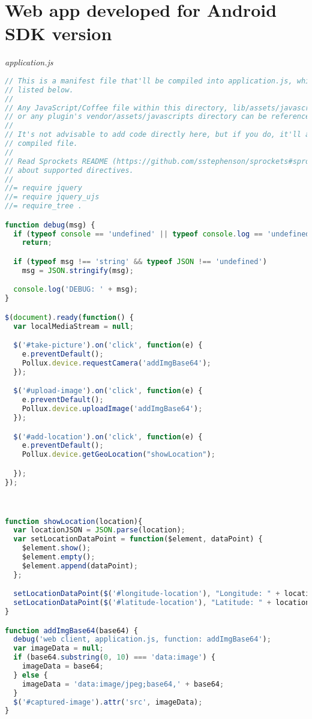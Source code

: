 \newpage

\section{Web app developed for Android SDK version} \label{App:AppendixC}
\emph{application.js}
\begin{lstlisting}[language=JavaScript]
// This is a manifest file that'll be compiled into application.js, which will include all the files
// listed below.
//
// Any JavaScript/Coffee file within this directory, lib/assets/javascripts, vendor/assets/javascripts,
// or any plugin's vendor/assets/javascripts directory can be referenced here using a relative path.
//
// It's not advisable to add code directly here, but if you do, it'll appear at the bottom of the
// compiled file.
//
// Read Sprockets README (https://github.com/sstephenson/sprockets#sprockets-directives) for details
// about supported directives.
//
//= require jquery
//= require jquery_ujs
//= require_tree .

function debug(msg) {
  if (typeof console == 'undefined' || typeof console.log == 'undefined')
    return;

  if (typeof msg !== 'string' && typeof JSON !== 'undefined')
    msg = JSON.stringify(msg);

  console.log('DEBUG: ' + msg);
}

$(document).ready(function() {
  var localMediaStream = null;

  $('#take-picture').on('click', function(e) {
    e.preventDefault();
    Pollux.device.requestCamera('addImgBase64');
  });

  $('#upload-image').on('click', function(e) {
    e.preventDefault();
    Pollux.device.uploadImage('addImgBase64');
  });

  $('#add-location').on('click', function(e) {
    e.preventDefault();
    Pollux.device.getGeoLocation("showLocation");

  });
});



function showLocation(location){
  var locationJSON = JSON.parse(location);
  var setLocationDataPoint = function($element, dataPoint) {
    $element.show();
    $element.empty();
    $element.append(dataPoint);
  };

  setLocationDataPoint($('#longitude-location'), "Longitude: " + locationJSON.longitude);
  setLocationDataPoint($('#latitude-location'), "Latitude: " + locationJSON.latitude);
}

function addImgBase64(base64) {
  debug('web client, application.js, function: addImgBase64');
  var imageData = null;
  if (base64.substring(0, 10) === 'data:image') {
    imageData = base64;
  } else {
    imageData = 'data:image/jpeg;base64,' + base64;
  }
  $('#captured-image').attr('src', imageData);
}
\end{lstlisting}
